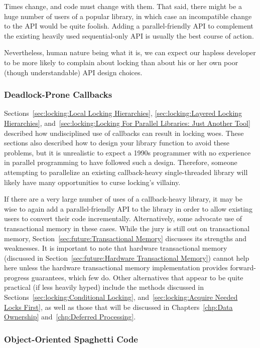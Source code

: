 Times change, and code must change with them.
That said, there might be a huge number of users of a popular library,
in which case an incompatible change to the API would be quite foolish.
Adding a parallel-friendly API to complement the existing heavily used
sequential-only API is usually the best course of action.

Nevertheless, human nature being what it is, we can expect our hapless
developer to be more likely to complain about locking than about his
or her own poor (though understandable) API design choices.

\subsubsection{Deadlock-Prone Callbacks}
\label{sec:locking:Deadlock-Prone Callbacks}

Sections~\ref{sec:locking:Local Locking Hierarchies},
\ref{sec:locking:Layered Locking Hierarchies},
and~\ref{sec:locking:Locking For Parallel Libraries: Just Another Tool}
described how undisciplined use of callbacks can result in locking
woes.
These sections also described how to design your library function to
avoid these problems, but it is unrealistic to expect a 1990s programmer
with no experience in parallel programming to have followed such a design.
Therefore, someone attempting to parallelize an existing callback-heavy
single-threaded library will likely have many opportunities to curse
locking's villainy.

If there are a very large number of uses of a callback-heavy library,
it may be wise to again add a parallel-friendly API to the library in
order to allow existing users to convert their code incrementally.
Alternatively, some advocate use of transactional memory in these cases.
While the jury is still out on transactional memory,
Section~\ref{sec:future:Transactional Memory} discusses its strengths and
weaknesses.
It is important to note that hardware transactional memory
(discussed in
Section~\ref{sec:future:Hardware Transactional Memory})
cannot help here unless the hardware transactional memory implementation
provides forward-progress guarantees, which few do.
Other alternatives that appear to be quite practical (if less heavily
hyped) include the methods discussed in
Sections~\ref{sec:locking:Conditional Locking},
and~\ref{sec:locking:Acquire Needed Locks First},
as well as those that will be discussed in
Chapters~\ref{chp:Data Ownership}
and~\ref{chp:Deferred Processing}.

\subsubsection{Object-Oriented Spaghetti Code}
\label{sec:locking:Object-Oriented Spaghetti Code}


